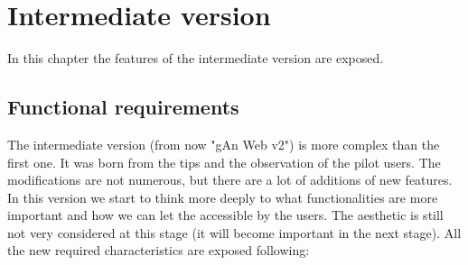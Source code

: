 
\chapter{Intermediate version} %

\label{Chapter4} %

In this chapter the features of the intermediate version are exposed.

\section{Functional requirements}

The intermediate version (from now "gAn Web v2") is more complex than the first one. It was born from the tips and the observation of the pilot users. The modifications are not numerous, but there are a lot of additions of new features. In this version we start to think more deeply to what functionalities are more important and how we can let the accessible by the users. The aesthetic is still not very considered at this stage (it will become important in the next stage). 
All the new required characteristics are exposed following:

